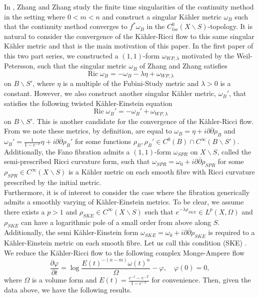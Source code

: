 \documentclass[12pt]{article}
\numberwithin{equation}{section}
\renewcommand{\d}{\partial}
\newcommand{\dbar}{\overline{\partial}}
\DeclareMathOperator{\Ric}{Ric}
\begin{document}
\noindent In \cite{ZZ20}, Zhang and Zhang study the finite time singularities of the continuity method in the setting where $0 < m < n$ and construct a singular K\"ahler metric $\omega_B$ such that the continuity method converges to $f^*\omega_B$ in the $C^0_{loc}(X \backslash S)$-topology. It is natural to consider the convergence of the K\"ahler-Ricci flow to this same singular K\"ahler metric and that is the main motivation of this paper. In the first paper \cite{B25II} of this two part series, we constructed a $(1,1)$-form $\omega_{WP,\lambda}$ motivated by the Weil-Petersson, such that the singular metric $\omega_B$ of Zhang and Zhang satisfies 
\begin{equation*}
    \Ric \omega_B = -\omega_B - \lambda \eta + \omega_{WP,\lambda}
\end{equation*}
on $B \backslash S'$, where $\eta$ is a multiple of the Fubini-Study metric and $\lambda > 0$ is a constant. However, we also construct another singular K\"ahler metric, $\omega_B'$, that satisfies the following twisted K\"ahler-Einstein equation
\begin{equation*}
    \Ric \omega_B' = -\omega_B' + \omega_{WP,\lambda}
\end{equation*}
on $B \backslash S'$. This is another candidate for the convergence of the K\"ahler-Ricci flow. From \cite{ZZ20, B25II} we note these metrics, by definition, are equal to $\omega_B = \eta + i\d\dbar \rho_B$ and $\omega_B' = \frac{1}{1-e^{-T}} \eta + i\d\dbar \rho_B'$ for some functions $\rho_B, \rho_B' \in C^0(B) \cap C^{\infty}(B \backslash S')$. Additionally, the Fano fibration admits a $(1,1)$-form $\omega_{SPR}$ on $X \backslash S$, called the semi-prescribed Ricci curvature form, such that $\omega_{SPR} = \omega_0 + i\d\dbar \rho_{SPR}$ for some $\rho_{SPR} \in C^{\infty}(X \backslash S)$ is a K\"ahler metric on each smooth fibre with Ricci curvature prescribed by the initial metric.\\
Furthermore, it is of interest to consider the case where the fibration generically admits a smoothly varying of K\"ahler-Einstein metrics. To be clear, we assume there exists a $p > 1$ and $\rho_{SKE} \in C^{\infty}(X\backslash S)$ such that $e^{-\lambda\rho_{SKE}} \in L^p(X, \Omega)$ and $\rho_{SKE}$ can have a logarithmic pole of a small order from above along $S$. Additionally,
the semi K\"ahler-Einstein form $\omega_{SKE} = \omega_0 + i\d\dbar \rho_{SKE}$ is required to a K\"ahler-Einstein metric on each smooth fibre. Let us call this condition (SKE) \cite{B25II}.\\
We reduce the K\"ahler-Ricci flow to the following complex Monge-Ampere flow
\begin{equation*}
    \frac{\d \varphi}{\d t} = \log\frac{E(t)^{-(n-m)} \omega(t)^n}{\Omega} - \varphi, \quad \varphi(0) = 0,
\end{equation*}
where $\Omega$ is a volume form and $E(t) = \frac{e^{-t}-e^{-T}}{1-e^{-T}}$ for convenience. Then, given the data above, we have the following results.
\end{document}
